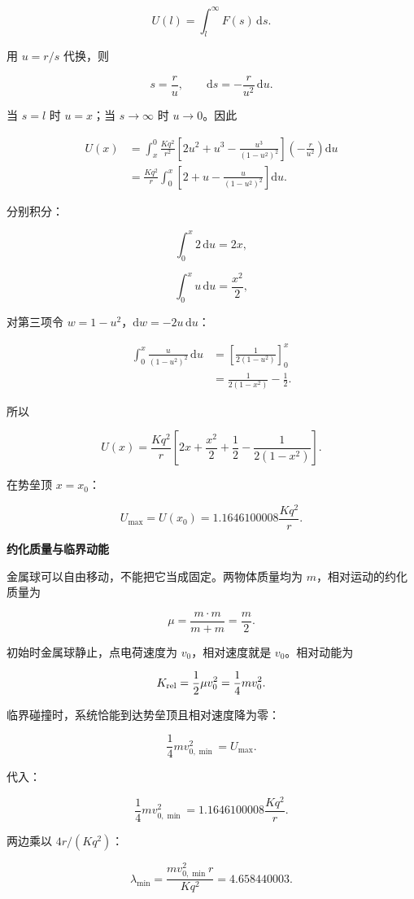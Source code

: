 \documentclass[12pt,a4paper,UTF8]{ctexart}
\begin{document}
\[U(l)=\int_l^\infty F(s)\,\mathrm{d}s.\]

用 \(u=r/s\) 代换，则

\[s=\frac ru,\qquad \mathrm{d}s=-\frac r{u^2}\,\mathrm{d}u.\]

当 \(s=l\) 时 \(u=x\)；当 \(s\to\infty\) 时 \(u\to0\)。因此

\[\begin{aligned}
U(x)
&=\int_x^0\frac{Kq^2}{r^2}\left[
2u^2+u^3-\frac{u^3}{(1-u^2)^2}
\right]\left(-\frac r{u^2}\right)\mathrm{d}u\\
&=\frac{Kq^2}{r}
\int_0^x\left[
2+u-\frac{u}{(1-u^2)^2}
\right]\mathrm{d}u.
\end{aligned}\]

分别积分：

\[\int_0^x2\,\mathrm{d}u=2x,\]

\[\int_0^xu\,\mathrm{d}u=\frac{x^2}{2},\]

对第三项令 \(w=1-u^2\)，\(\mathrm{d}w=-2u\,\mathrm{d}u\)：

\[\begin{aligned}
\int_0^x\frac{u}{(1-u^2)^2}\,\mathrm{d}u
&=\left[\frac{1}{2(1-u^2)}\right]_0^x\\
&=\frac{1}{2(1-x^2)}-\frac12.
\end{aligned}\]

所以

\[\boxed{
U(x)=\frac{Kq^2}{r}\left[
2x+\frac{x^2}{2}+\frac12-
\frac{1}{2(1-x^2)}
\right]
}.\]

在势垒顶 \(x=x_0\)：

\[U_{\max}=U(x_0)=1.1646100008\frac{Kq^2}{r}.\]

\textbf{约化质量与临界动能}

金属球可以自由移动，不能把它当成固定。两物体质量均为
\(m\)，相对运动的约化质量为

\[\mu=\frac{m\cdot m}{m+m}=\frac m2.\]

初始时金属球静止，点电荷速度为 \(v_0\)，相对速度就是 \(v_0\)。相对动能为

\[K_{\rm rel}=\frac12\mu v_0^2=\frac14mv_0^2.\]

临界碰撞时，系统恰能到达势垒顶且相对速度降为零：

\[\frac14mv_{0,\min}^2=U_{\max}.\]

代入：

\[\frac14mv_{0,\min}^2
=1.1646100008\frac{Kq^2}{r}.\]

两边乘以 \(4r/(Kq^2)\)：

\[\boxed{
\lambda_{\min}
=\frac{mv_{0,\min}^2r}{Kq^2}
=4.658440003
}.\]
\end{document}
